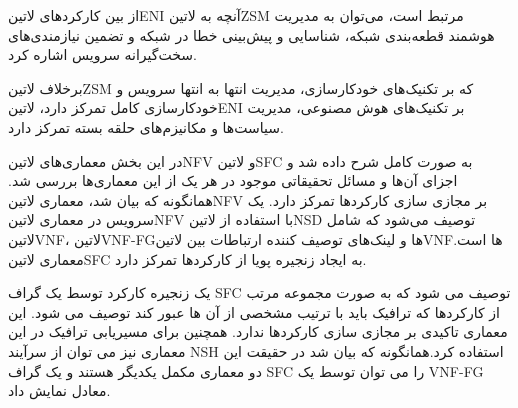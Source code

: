 
از بین کارکردهای ‌لاتین{ENI} آنچه به ‌لاتین{ZSM} مرتبط است،
می‌توان به مدیریت هوشمند قطعه‌بندی شبکه، شناسایی و پیش‌بینی خطا در شبکه
و تضمین نیازمندی‌های سخت‌گیرانه سرویس اشاره کرد.

برخلاف ‌لاتین{ZSM} که بر تکنیک‌های خودکارسازی، مدیریت انتها به انتها سرویس و
خودکارسازی کامل تمرکز دارد، ‌لاتین{ENI} بر تکنیک‌های هوش مصنوعی، مدیریت سیاست‌‌ها
و مکانیزم‌های حلقه بسته تمرکز دارد.


در این بخش معماری‌های ‌لاتین{NFV} و ‌لاتین{SFC} به صورت کامل شرح داده شد و اجزای آن‌ها و مسائل تحقیقاتی موجود در هر یک از این معماری‌ها بررسی شد.
همانگونه که بیان شد، معماری ‌لاتین{NFV} بر مجازی سازی کارکردها تمرکز دارد. یک سرویس در معماری ‌لاتین{NFV} با استفاده از ‌لاتین{NSD} توصیف می‌شود که شامل ‌لاتین{VNF}، ‌لاتین{VNF-FG}ها و لینک‌های توصیف کننده
ارتباطات بین ‌لاتین{VNF}ها است. معماری ‌لاتین{SFC} به ایجاد زنجیره پویا از کارکردها تمرکز دارد.

یک زنجیره کارکرد توسط یک گراف SFC توصیف می شود که به صورت مجموعه مرتب از کارکردها که ترافیک باید با ترتیب مشخصی از آن ها عبور کند توصیف می شود. این معماری تاکیدی بر مجازی سازی کارکردها ندارد. همچنین برای مسیریابی ترافیک در این معماری نیز می توان از سرآیند NSH استفاده کرد.همانگونه که بیان شد در حقیقت این دو معماری مکمل یکدیگر هستند و یک گراف SFC را می توان توسط یک VNF-FG معادل نمایش داد.
